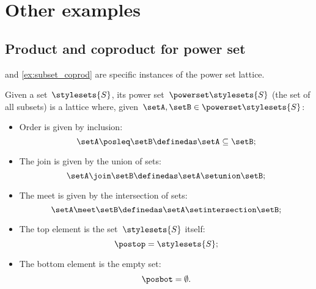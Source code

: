 
\section{Other examples}

\subsection{Product and coproduct for power set}
 and \cref{ex:subset_coprod} are specific instances of the power set lattice.

\begin{ctdefinition}
	\label{def:power-set-as-lattice}
	Given a set~$\stylesets{S}$, its power set~$\powerset \stylesets{S}$ (the set of all subsets) is a lattice where, given~$\setA,\setB\in \powerset \stylesets{S}$:
	\begin{itemize}
		\item Order is given by inclusion:
		      \begin{equation*}
			      \setA\posleq \setB \definedas \setA\subseteq \setB;
		      \end{equation*}
		\item The join is given by the union of sets:
		      \begin{equation*}
			      \setA\join \setB \definedas \setA\setunion \setB;
		      \end{equation*}
		\item The meet is given by the intersection of sets:
		      \begin{equation*}
			      \setA\meet \setB \definedas \setA\setintersection \setB;
		      \end{equation*}
		\item The top element is the set~$\stylesets{S}$ itself:
		      \begin{equation*}
			      \postop = \stylesets{S};
		      \end{equation*}
		\item The bottom element is the empty set:
		      \begin{equation*}
			      \posbot = \emptyset.
		      \end{equation*}
	\end{itemize}
\end{ctdefinition}

\begin{marginfigure}
	\centering
	\caption{}
	\label{fig:prod_coprod_power}
\end{marginfigure}

